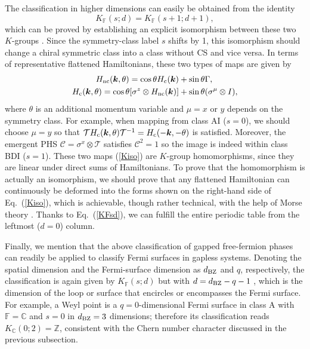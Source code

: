 \documentclass{tADP2e}
\theoremstyle{plain}
\theoremstyle{plain}
\theoremstyle{definition}
\begin{document}
The classification in higher dimensions can easily be obtained from the identity
\begin{equation}
K_{\mathbb{F}}(s;d)=K_{\mathbb{F}}(s+1;d+1), 
\label{KFsd}
\end{equation}
which can be proved by establishing an explicit isomorphism between these two $K$-groups \cite{TJCY10}. Since the symmetry-class label $s$ shifts by 1, this isomorphism should change a chiral symmetric class into a class without CS and vice versa. In terms of representative flattened Hamiltonians, these two types of maps are given by
\begin{equation}
\begin{split}
H_{\rm nc}(\boldsymbol{k},\theta)=\cos\theta H_{\rm c}(\boldsymbol{k})&+\sin\theta \Gamma, \\
H_{\rm c}(\boldsymbol{k},\theta)=\cos\theta [\sigma^z\otimes H_{\rm nc}(\boldsymbol{k})]&+\sin\theta (\sigma^\mu\otimes I),
\end{split}
\label{Kiso}
\end{equation}
where $\theta$ is an additional momentum variable and $\mu=x$ or $y$ depends on the symmetry class. For example, when mapping from class AI ($s=0$), we should choose $\mu=y$ so that $\mathcal{T}H_{\rm c}(\boldsymbol{k},\theta)\mathcal{T}^{-1}=H_{\rm c}(-\boldsymbol{k},-\theta)$ is satisfied. Moreover, the emergent PHS $\mathcal{C}=\sigma^x\otimes\mathcal{T}$ satisfies $\mathcal{C}^2=1$ so the image is indeed within class BDI ($s=1$). These two maps (\ref{Kiso}) are  $K$-group homomorphisms, since they are linear under direct sums of Hamiltonians. To prove that the homomorphism is actually an isomorphism, we should prove that any flattened Hamiltonian can continuously be deformed into the forms shown on the right-hand side of Eq.~(\ref{Kiso}), which is achievable, though rather technical, with the help of Morse theory \cite{TJCY10}. Thanks to Eq.~(\ref{KFsd}), we can fulfill the entire periodic table from the leftmost ($d=0$) column.

Finally, we mention that the above classification of gapped free-fermion phases can readily be applied to classify Fermi surfaces in gapless systems. Denoting the spatial dimension and the Fermi-surface dimension as $d_{\rm BZ}$ and $q$, respectively, the classification is again given by $K_{\mathbb{F}}(s;d)$ but with $d=d_{\rm BZ}-q-1$ \cite{SM13}, which is the dimension of the loop or surface that encircles or encompasses the Fermi surface. For example, a Weyl point is a $q=0$-dimensional Fermi surface in class A with $\mathbb{F}=\mathbb{C}$ and $s=0$ in $d_{\rm BZ}=3$ dimensions; therefore its classification reads $K_{\mathbb{C}}(0;2)=\mathbb{Z}$, consistent with the Chern number character discussed in the previous subsection.
\end{document}
